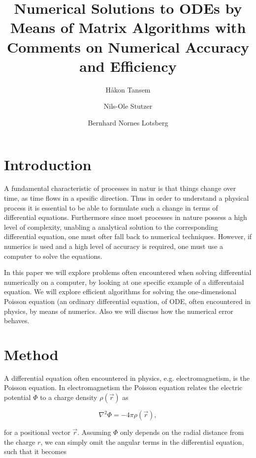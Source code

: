 \documentclass[twocolumn]{aastex62}
\begin{document}
\title{Numerical Solutions to ODEs by Means of Matrix Algorithms with Comments on Numerical Accuracy and Efficiency}




\author[0000-0002-0786-7307]{Håkon Tansem}

\author[0000-0002-0786-7307]{Nils-Ole Stutzer}

\author[0000-0002-0786-7307]{Bernhard Nornes Lotsberg}

\begin{abstract}

\end{abstract}

\section{Introduction} \label{sec:intro}
A fundamental characteristic of processes in natur is that things change over time, as time flows in a spesific direction. Thus in order to understand a physical process it is essential to be able to formulate such a change in terms of differential equations. Furthermore since most processes in nature possess a high level of complexity, unabling a analytical solution to the corresponding differential equation, one must ofter fall back to numerical techniques. However, if numerics is used and a high level of accuracy is required, one must use a computer to solve the equations.

In this paper we will explore problems often encountered when solving differential numerically on a computer, by looking at one specific example of a differentaial equation. We will explore efficient algorithms for solving the one-dimensional Poisson equation (an ordinary differential equation, of ODE, often encountered in physics, by means of numerics. Also we will discuss how the numerical error behaves.
 
\section{Method} \label{sec:method}
A differential equation often encountered in physics, e.g. electromagnetism,  is the Poisson equation. In electromagnetism the Poisson equation relates the electric potential $\Phi$ to a charge density $\rho(\vec{r})$ as 

\begin{equation}
	\nabla^2\Phi = -4\pi\rho(\vec{r}),
\end{equation}

for a positional vector $\vec{r}$. Assuming $\Phi$ only depends on the radial distance from the charge $r$, we can simply omit the angular terms in the differential equation, such that it becomes
 
\end{document}
